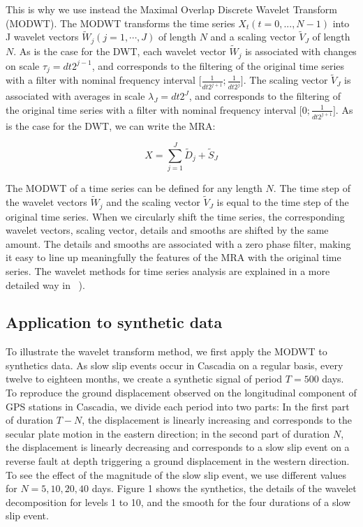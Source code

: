 \documentclass[draft]{agujournal2018}
\begin{document}
This is why we use instead the Maximal Overlap Discrete Wavelet Transform (MODWT). The MODWT transforms the time series $X_t \left( t = 0, ... , N - 1 \right)$ into J wavelet vectors $\widetilde{W}_j \left( j = 1 ,  \cdots , J \right)$ of length $N$ and a scaling vector $\widetilde{V}_J$ of length $N$. As is the case for the DWT, each wavelet vector $\widetilde{W}_j$ is associated with changes on scale $\tau_j = dt 2^{j - 1}$, and corresponds to the filtering of the original time series with a filter with nominal frequency interval $\lbrack \frac{1}{dt 2^{j + 1}} ; \frac{1}{dt 2^j} \rbrack$. The scaling vector $\widetilde{V}_J$ is associated with averages in scale $\lambda_J = dt 2^J$, and corresponds to the filtering of the original time series with a filter with nominal frequency interval $\lbrack 0 ; \frac{1}{dt 2^{j + 1}} \rbrack$. As is the case for the DWT, we can write the MRA:

\begin{linenomath*}
\begin{equation}
X = \sum_{j = 1}^{J} \widetilde{D}_j + \widetilde{S}_J
\end{equation}
\end{linenomath*}

The MODWT of a time series can be defined for any length $N$. The time step of the wavelet vectors $\widetilde{W}_j$ and the scaling vector $\widetilde{V}_J$ is equal to the time step of the original time series. When we circularly shift the time series, the corresponding wavelet vectors, scaling vector, details and smooths are shifted by the same amount. The details and smooths are associated with a zero phase filter, making it easy to line up meaningfully the features of the MRA with the original time series. The wavelet methods for time series analysis are explained in a more detailed way in ~\citet{PER_2000}). \\

\subsection{Application to synthetic data}

To illustrate the wavelet transform method, we first apply the MODWT to synthetics data. As slow slip events occur in Cascadia on a regular basis, every twelve to eighteen months, we create a synthetic signal of period $T = 500$ days. To reproduce the ground displacement observed on the longitudinal component of GPS stations in Cascadia, we divide each period into two parts: In the first part of duration $T - N$, the displacement is linearly increasing and corresponds to the secular plate motion in the eastern direction; in the second part of duration $N$, the displacement is linearly decreasing and corresponds to a slow slip event on a reverse fault at depth triggering a ground displacement in the western direction. To see the effect of the magnitude of the slow slip event, we use different values for $N = 5, 10, 20, 40$ days. Figure 1 shows the synthetics, the details of the wavelet decomposition for levels 1 to 10, and the smooth for the four durations of a slow slip event. \\
\end{document}
